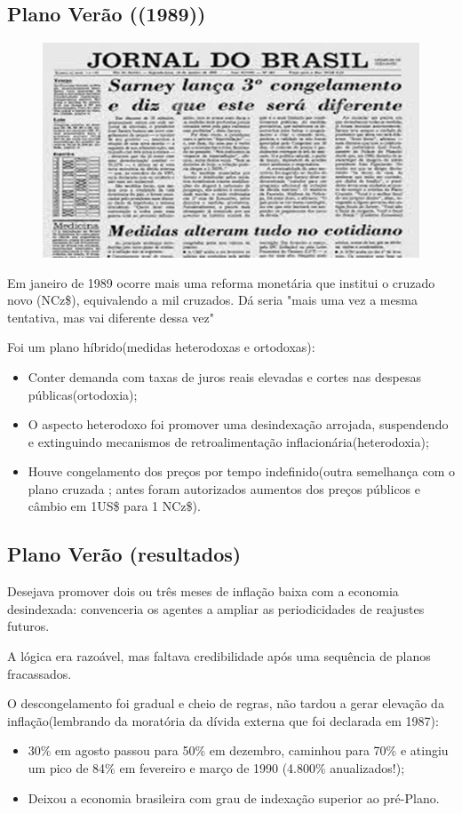 \documentclass[a4paper,12pt]{article}[abntex2]
\begin{document}
\subsection{\textbf{Plano Verão ((1989))}}
\begin{figure}[H]
    \centering
    \includegraphics[width=0.7\linewidth]{Imagens/a11i3.png}
\end{figure}

Em janeiro de 1989 ocorre mais uma reforma monetária que institui o cruzado novo (NCz\$), equivalendo a mil cruzados. Dá seria "mais uma vez a mesma tentativa, mas vai diferente dessa vez"

Foi um plano híbrido(medidas heterodoxas e ortodoxas):
\begin{itemize}
    \item Conter demanda com taxas de juros reais elevadas e cortes nas despesas públicas(ortodoxia);
    \item O aspecto heterodoxo foi promover uma desindexação arrojada, suspendendo e extinguindo mecanismos de retroalimentação inflacionária(heterodoxia);
    \item Houve congelamento dos preços por tempo indefinido(outra semelhança com o plano cruzada ; antes foram autorizados aumentos dos preços públicos e câmbio em 1US\$ para 1 NCz\$).
\end{itemize}

\subsection{\textbf{Plano Verão (resultados)}}
Desejava promover dois ou três meses de inflação baixa com a economia desindexada: convenceria os agentes a ampliar as periodicidades de reajustes futuros.

A lógica era razoável, mas faltava credibilidade após uma sequência de planos fracassados.

O descongelamento foi gradual e cheio de regras, não tardou a gerar elevação da inflação(lembrando da moratória da dívida externa que foi declarada em 1987):
\begin{itemize}
    \item 30\% em agosto passou para 50\% em dezembro, caminhou para 70\% e atingiu um pico de 84\% em fevereiro e março de 1990 (4.800\% anualizados!);
    \item Deixou a economia brasileira com grau de indexação superior ao pré-Plano.
\end{itemize}
\end{document}
